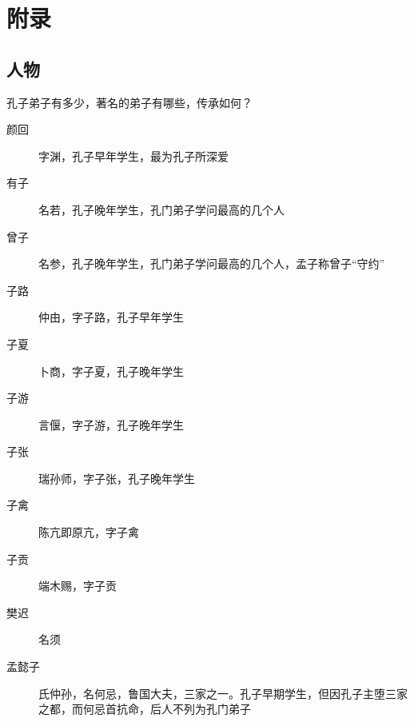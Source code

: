 \documentclass[main.tex]{subfiles}
\begin{document}
\chapter{附录}

\section{人物}

孔子弟子有多少，著名的弟子有哪些，传承如何？
\begin{description}
    \item[颜回] 字渊，孔子早年学生，最为孔子所深爱
    \item[有子] 名若，孔子晚年学生，孔门弟子学问最高的几个人
    \item[曾子] 名参，孔子晚年学生，孔门弟子学问最高的几个人，孟子称曾子“守约”
    \item[子路] 仲由，字子路，孔子早年学生
    \item[子夏] 卜商，字子夏，孔子晚年学生
    \item[子游] 言偃，字子游，孔子晚年学生
    \item[子张] 瑞孙师，字子张，孔子晚年学生
    \item[子禽] 陈亢即原亢，字子禽
    \item[子贡] 端木赐，字子贡
    \item[樊迟] 名须
    \item[孟懿子] 氏仲孙，名何忌，鲁国大夫，三家之一。孔子早期学生，但因孔子主堕三家之都，而何忌首抗命，后人不列为孔门弟子
\end{description}
\end{document}
